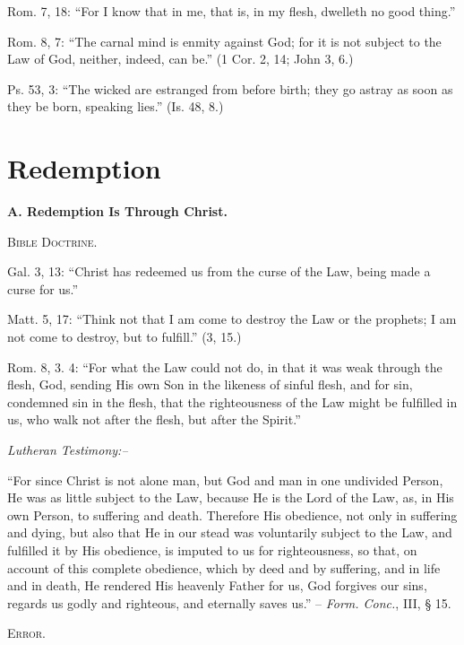 \documentclass[
]{book}
\begin{document}
Rom. 7, 18: ``For I know that in me, that is, in my flesh, dwelleth no good thing.''

Rom. 8, 7: ``The carnal mind is enmity against God; for it is not subject to the Law of God, neither, indeed, can be.'' (1 Cor. 2, 14; John 3, 6.)

Ps. 53, 3: ``The wicked are estranged from before birth; they go astray as soon as they be born, speaking lies.'' (Is. 48, 8.)

\section{Redemption}\label{redemption}

\begin{center}
\textbf{A.  Redemption Is Through Christ.}

\textsc{Bible Doctrine.}
\end{center}

Gal. 3, 13: ``Christ has redeemed us from the curse of the Law, being made a curse for us.''

Matt. 5, 17: ``Think not that I am come to destroy the Law or the prophets; I am not come to destroy, but to fulfill.'' (3, 15.)

Rom. 8, 3. 4: ``For what the Law could not do, in that it was weak through the flesh, God, sending His own Son in the likeness of sinful flesh, and for sin, condemned sin in the flesh, that the righteousness of the Law might be fulfilled in us, who walk not after the flesh, but after the Spirit.''

\begin{center}
\textsl{Lutheran Testimony:--}
\end{center}

``For since Christ is not alone man, but God and man in one undivided Person, He was as little subject to the Law, because He is the Lord of the Law, as, in His own Person, to suffering and death. Therefore His obedience, not only in suffering and dying, but also that He in our stead was voluntarily subject to the Law, and fulfilled it by His obedience, is imputed to us for righteousness, so that, on account of this complete obedience, which by deed and by suffering, and in life and in death, He rendered His heavenly Father for us, God forgives our sins, regards us godly and righteous, and eternally saves us.'' -- \emph{Form. Conc.}, III, § 15.

\begin{center}
\textsc{Error.}
\end{center}
\end{document}
